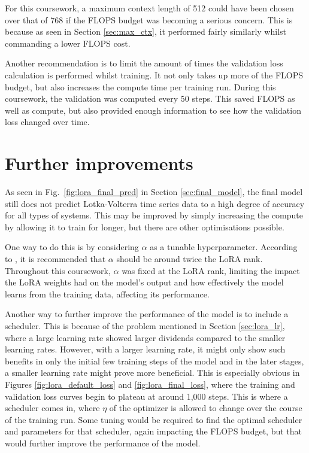 \documentclass[11pt,a4paper]{article}
\begin{document}
For this coursework, a maximum context length of 512 could have been chosen over that of 768 if the FLOPS budget was becoming a serious concern. This is because as seen in Section \ref{sec:max_ctx}, it performed fairly similarly whilst commanding a lower FLOPS cost.

Another recommendation is to limit the amount of times the validation loss calculation is performed whilst training. It not only takes up more of the FLOPS budget, but also increases the compute time per training run. During this coursework, the validation was computed every 50 steps. This saved FLOPS as well as compute, but also provided enough information to see how the validation loss changed over time.

\section{Further improvements}

As seen in Fig.~\ref{fig:lora_final_pred} in Section \ref{sec:final_model}, the final model still does not predict Lotka-Volterra time series data to a high degree of accuracy for all types of systems. This may be improved by simply increasing the compute by allowing it to train for longer, but there are other optimisations possible.

One way to do this is by considering $\alpha$ as a tunable hyperparameter. According to \citeauthor{hu2021loralowrankadaptationlarge}, it is recommended that $\alpha$ should be around twice the LoRA rank. Throughout this coursework, $\alpha$ was fixed at the LoRA rank, limiting the impact the LoRA weights had on the model's output and how effectively the model learns from the training data, affecting its performance.

Another way to further improve the performance of the model is to include a scheduler. This is because of the problem mentioned in Section \ref{sec:lora_lr}, where a large learning rate showed larger dividends compared to the smaller learning rates. However, with a larger learning rate, it might only show such benefits in only the initial few training steps of the model and in the later stages, a smaller learning rate might prove more beneficial. This is especially obvious in Figures \ref{fig:lora_default_loss} and \ref{fig:lora_final_loss}, where the training and validation loss curves begin to plateau at around 1,000 steps. This is where a scheduler comes in, where $\eta$ of the optimizer is allowed to change over the course of the training run. Some tuning would be required to find the optimal scheduler and parameters for that scheduler, again impacting the FLOPS budget, but that would further improve the performance of the model.
\end{document}
